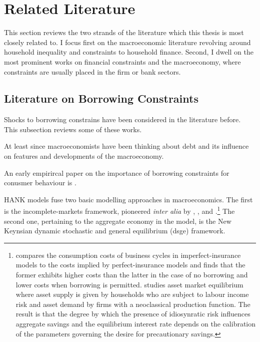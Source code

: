 \documentclass[12pt]{article} %
\numberwithin{equation}{section} %
\begin{document}
\section{Related Literature}
\label{sec:literature}

This section reviews the two strands of the literature which this thesis is most closely related to. I focus first on the macroeconomic literature revolving around household inequality and constraints to household finance. Second, I dwell on the most prominent works on financial constraints and the macroeconomy, where constraints are usually placed in the firm or bank sectors.

\subsection{Literature on Borrowing Constraints}
\label{sec:literature-borrowing}

Shocks to borrowing constrains have been considered in the literature before. This subsection reviews some of these works.

At least since \textcite{fisher1933} macroeconomists have been thinking about debt and its influence on features and developments of the macroeconomy.

An early empirircal paper on the importance of borrowing constraints for conusmer behaviour is \textcite{gross2002}.

HANK models fuse two basic modelling approaches in macroeconomics. The first is the incomplete-markets framework, pioneered \textit{inter alia} by \textcite{bewley1986}, \textcite{im1989}, \textcite{huggett1993} and \textcite{aiyagari1994}.\footnote{\textcite{im1989} compares the consumption costs of business cycles in imperfect-insurance models to the costs implied by perfect-insurance models and finds that the former exhibits higher costs than the latter in the case of no borrowing and lower costs when borrowing is permitted. \textcite{aiyagari1994} studies asset market equilibrium where asset supply is given by households who are subject to labour income risk and asset demand by firms with a neoclassical production function. The result is that the degree by which the presence of idiosynratic risk influences aggregate savings and the equilibrium interest rate depends on the calibration of the parameters governing the desire for precautionary savings.} The second one, pertaining to the aggregate economy in the model, is the New Keynsian dynamic stochastic and general equilibrium (\Gls{dsge}) framework.
\end{document}
